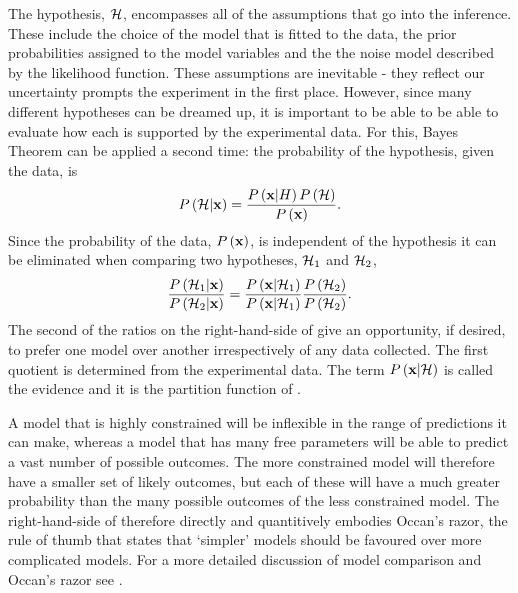 The hypothesis, ${\cal H}$,  encompasses all of the assumptions that go into the inference.
These include the choice of the model that is fitted to the data, 
the prior probabilities assigned to the model variables and the 
the noise model described by the likelihood function.
These assumptions are inevitable - they reflect our uncertainty 
 prompts the experiment in the first place.
However, 
since many different hypotheses can be dreamed up,
it is important to be able to be able to evaluate how each is supported by the experimental data.
For this, Bayes Theorem can be applied a second time:
the probability of the hypothesis, given the data, is
\begin{align}
P\left( {\cal H} | \mathbf{x}  \right) = \frac{P\left( \mathbf{x}|H \right)P\left( {\cal H} \right)}{P\left( \mathbf{x} \right)}.
\label{eqn:BayesHyp}
\end{align}
Since the probability of the data, $P\left( \mathbf{x} \right)$, 
is independent of the hypothesis
it can be eliminated when comparing two hypotheses, ${\cal H}_1$ and ${\cal H}_2$,
\begin{align}
\frac{P\left( {\cal H}_1 | \mathbf{x}  \right)}{P\left( {\cal H}_2 | \mathbf{x}  \right)} = \frac{P\left( \mathbf{x}|{\cal H}_1 \right)}{P\left( \mathbf{x}|{\cal H}_1 \right)}\frac{P\left( {\cal H}_2 \right)}{P\left( {\cal H}_2 \right)}.
\label{eqn:ModelCmp}
\end{align}
The second of the ratios on the right-hand-side of 
give an opportunity, if desired, to prefer one model over another irrespectively of any data collected.
The first quotient is determined from the experimental data.
The term $P\left( \mathbf{x}|{\cal H} \right)$ is called the evidence and it is the partition function of  .

A model that is highly constrained will be inflexible in the range of predictions it can make,
whereas a model that has many free parameters will be able to predict a vast number of possible outcomes.
The more constrained model will therefore have a smaller set of likely outcomes,
but each of these will have a much greater probability than the many possible outcomes of the less constrained model.
The right-hand-side of  therefore directly and quantitively embodies Occan's razor,
the rule of thumb that states that `simpler' models should be favoured over more complicated models.
For a more detailed discussion of model comparison and Occan's razor see \cite[Chapter 28]{Mackay2003}.

